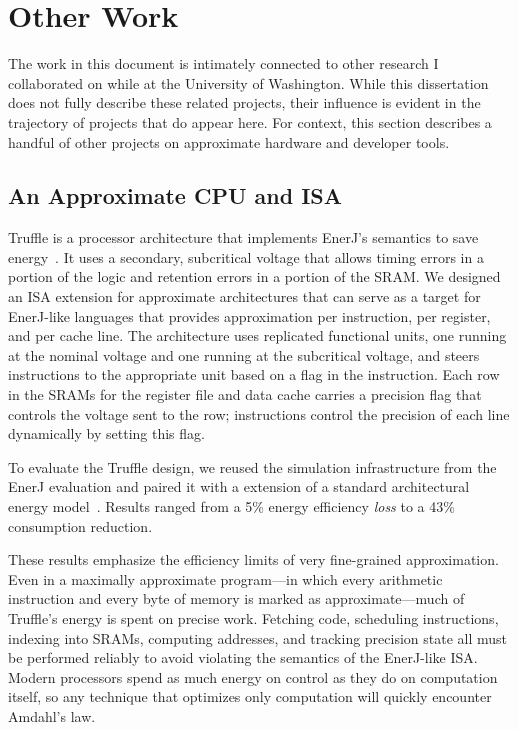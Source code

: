 \section{Other Work}

The work in this document is intimately connected to other research I
collaborated on while at the University of Washington.
While this dissertation does not fully describe these related projects, their
influence is evident in the trajectory of projects that do appear here.
For context, this section describes a handful of other projects on approximate
hardware and developer tools.

\subsection{An Approximate CPU and ISA}

Truffle is a processor architecture that implements EnerJ's semantics to save
energy~\cite{truffle}. It uses a secondary, subcritical voltage that allows timing errors in
a portion of the logic and retention errors in a portion of the SRAM.
We
designed an ISA extension for approximate architectures that can serve as a
target for EnerJ-like languages that provides approximation per instruction,
per register, and per cache line.
The architecture uses replicated functional units, one running at the nominal
voltage and one running at the subcritical voltage, and steers instructions to the
appropriate unit based on a flag in the instruction. Each row in the SRAMs for
the register file and data cache carries a precision flag that controls the
voltage sent to the row; instructions control the precision of each line
dynamically by setting this flag.

To evaluate the Truffle design,
we reused the simulation infrastructure from the EnerJ evaluation and paired
it with a extension of a standard architectural energy model~\cite{mcpat}.
Results ranged from a 5\% energy efficiency \emph{loss} to a 43\%
consumption reduction.

These results emphasize the efficiency limits of very fine-grained
approximation. Even in a maximally approximate program---in which every
arithmetic instruction and every byte of memory is marked as
approximate---much of Truffle's energy is spent on precise work. Fetching
code, scheduling instructions, indexing into SRAMs, computing addresses, and
tracking precision state all must be performed reliably to avoid violating
the semantics of the EnerJ-like ISA.
Modern processors spend as much energy on
control as they do on computation itself, so any technique that optimizes only
computation will quickly encounter Amdahl's law.

